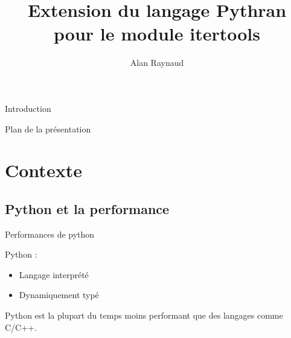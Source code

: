 \documentclass{beamer}
\title{Extension du langage Pythran pour le module itertools}
\author{Alan Raynaud}
\date{}
\begin{document}
\lstset{language=python, numbers=left, numberstyle=\tiny,
  showstringspaces=false, frame=leftline }

\begin{frame}{Introduction}
  \titlepage
\end{frame}


\begin{frame}{Plan de la présentation}

  \setcounter{tocdepth}{1}
  \tableofcontents
  \setcounter{tocdepth}{3}

\end{frame}

\section{Contexte}

\subsection{Python et la performance}

\begin{frame}{Performances de python}

  Python :
  \begin{itemize}
    \item Langage interprété 
    \item Dynamiquement typé
  \end{itemize}

  \pause Python est la plupart du temps moins performant que des
  langages comme C/C++.

\end{frame}
\end{document}
